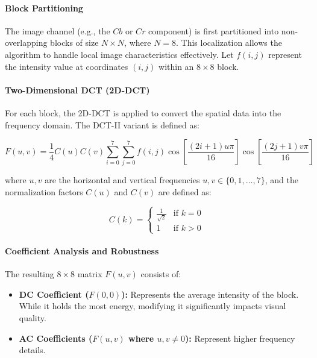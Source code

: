 \documentclass[12pt,a4paper,oneside]{report}
\begin{document}
\begin{enumerate}
		\paragraph{Block Partitioning} %
		The image channel (e.g., the $Cb$ or $Cr$ component) is first partitioned into non-overlapping blocks of size $N \times N$, where $N=8$. This localization allows the algorithm to handle local image characteristics effectively. Let $f(i, j)$ represent the intensity value at coordinates $(i, j)$ within an $8 \times 8$ block.
		
		\paragraph{Two-Dimensional DCT (2D-DCT)}
		For each block, the 2D-DCT is applied to convert the spatial data into the frequency domain. The DCT-II variant is defined as:
		
		\begin{equation}
			F(u, v) = \frac{1}{4} C(u) C(v) \sum_{i=0}^{7} \sum_{j=0}^{7} f(i, j) \cos \left[ \frac{(2i+1)u\pi}{16} \right] \cos \left[ \frac{(2j+1)v\pi}{16} \right]
		\end{equation}
		
		where $u, v$ are the horizontal and vertical frequencies $u, v \in \{0, 1, \dots, 7\}$, and the normalization factors $C(u)$ and $C(v)$ are defined as:
		
		\begin{equation}
			C(k) = 
			\begin{cases} 
				\frac{1}{\sqrt{2}} & \text{if } k = 0 \\
				1 & \text{if } k > 0 
			\end{cases}
		\end{equation}
		
		\paragraph{Coefficient Analysis and Robustness}
		The resulting $8 \times 8$ matrix $F(u, v)$ consists of:
		\begin{itemize}
			\item \textbf{DC Coefficient ($F(0,0)$):} Represents the average intensity of the block. While it holds the most energy, modifying it significantly impacts visual quality.
			\item \textbf{AC Coefficients ($F(u,v)$ where $u,v \neq 0$):} Represent higher frequency details.
		\end{itemize}
		

\end{enumerate}
\end{document}

